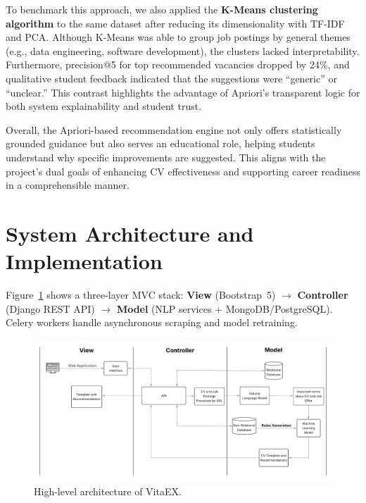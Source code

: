 \documentclass[runningheads]{llncs}
\begin{document}
	To benchmark this approach, we also applied the \textbf{K-Means clustering algorithm} to the same dataset after reducing its dimensionality with TF-IDF and PCA. Although K-Means was able to group job postings by general themes (e.g., data engineering, software development), the clusters lacked interpretability. Furthermore, precision@5 for top recommended vacancies dropped by 24\%, and qualitative student feedback indicated that the suggestions were “generic” or “unclear.” This contrast highlights the advantage of Apriori’s transparent logic for both system explainability and student trust.
	
	Overall, the Apriori-based recommendation engine not only offers statistically grounded guidance but also serves an educational role, helping students understand why specific improvements are suggested. This aligns with the project’s dual goals of enhancing CV effectiveness and supporting career readiness in a comprehensible manner.
	

	\section{System Architecture and Implementation}
	
	Figure~\ref{fig:blocks} shows a three-layer MVC stack: \textbf{View} (Bootstrap~5) $\rightarrow$ \textbf{Controller} (Django REST API) $\rightarrow$ \textbf{Model} (NLP services + MongoDB/PostgreSQL). Celery workers handle asynchronous scraping and model retraining.
	
	\begin{figure}[H]
		\centering
		\includegraphics[width=1\linewidth]{imagenes/Arquitectura_Sistema.png}
		\caption{High-level architecture of VitaEX.}
		\label{fig:blocks}
	\end{figure}
	
\end{document}
